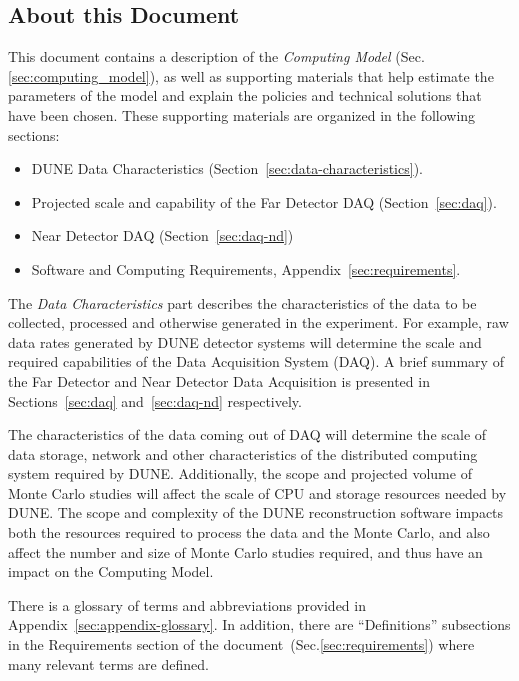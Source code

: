 \subsection{About this Document}
\label{sec:modelrole}

This document contains a description of the \textit{Computing Model} (Sec.\ref{sec:computing_model}),
as well as supporting materials that help estimate the parameters of the model and
explain the policies and technical solutions that have been chosen.  These supporting materials are
organized in the following sections:

\begin{itemize}
\item DUNE Data Characteristics (Section~\ref{sec:data-characteristics}).
\item Projected scale and capability of the Far Detector DAQ (Section~\ref{sec:daq}).
\item Near Detector DAQ (Section~\ref{sec:daq-nd})
\item Software and Computing Requirements, Appendix~\ref{sec:requirements}.
\end{itemize}

\noindent
The \textit{Data Characteristics} part describes the characteristics of the data to be collected, processed and otherwise generated in the experiment.
For example, raw data rates generated by DUNE detector systems will determine the scale and required capabilities of the Data
Acquisition System (DAQ).  A brief summary of the Far Detector and Near Detector Data Acquisition is presented in Sections~\ref{sec:daq}
and~\ref{sec:daq-nd} respectively.

The characteristics of the data coming out of DAQ will determine the scale of data storage, network
and other characteristics of the distributed computing system required by DUNE.  Additionally, the scope and projected
volume of Monte Carlo studies  will affect the scale of CPU and storage resources needed by DUNE.  The scope and complexity of the DUNE
reconstruction software impacts both the resources required to process the data and the Monte Carlo, and also affect the
number and size of Monte Carlo studies required, and thus have an impact on the Computing Model.

There is a glossary of terms and abbreviations provided in Appendix~\ref{sec:appendix-glossary}. In addition,
there are ``Definitions'' subsections in the Requirements section of the document~(Sec.\ref{sec:requirements}) where
many relevant terms are defined.

